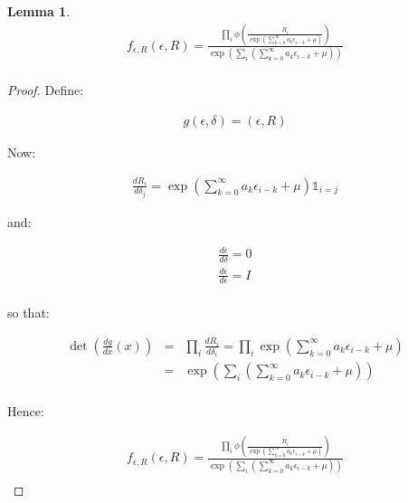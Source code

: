 \documentclass{article}
\newtheorem{lemma}{Lemma}
\begin{document}
\begin{lemma}
  \begin{eqnarray*}
    f_{\epsilon,R}\left(\epsilon,R\right) = \frac{\prod_i \phi\left( \frac{R_i}{\exp\left(\sum_{k=0}^\infty a_k \epsilon_{i-k} + \mu\right)}\right)}{\exp\left(\sum_i \left(\sum_{k=0}^\infty a_k \epsilon_{i-k} + \mu\right)\right)}\\
  \end{eqnarray*}
\end{lemma}
\begin{proof}
  Define:

  \begin{eqnarray*}
    g(\epsilon, \delta) = \left(\epsilon, R\right)
  \end{eqnarray*}

  Now:

  \begin{eqnarray*}
    \frac{d\!R_i}{d\!\delta_j} = \exp\left(\sum_{k=0}^\infty a_k\epsilon_{i-k} + \mu\right) \mathbb{1}_{i=j}
  \end{eqnarray*}

  and:

  \begin{eqnarray*}
    \frac{d\!\epsilon}{d\!\delta} = 0\\
    \frac{d\!\epsilon}{d\!\epsilon} = I\\
  \end{eqnarray*}

  so that:

  \begin{eqnarray*}
    \det\left(\frac{d\!g}{d\!x}(x)\right) & = & \prod_i \frac{d\!R_i}{d\!\delta_i} = \prod_i \exp\left(\sum_{k=0}^\infty a_k \epsilon_{i-k} + \mu\right)\\
    & = & \exp\left(\sum_i \left(\sum_{k=0}^\infty a_k \epsilon_{i-k} + \mu\right)\right)\\
  \end{eqnarray*}

  Hence:

  \begin{eqnarray*}
    f_{\epsilon,R}\left(\epsilon,R\right) = \frac{\prod_i \phi\left( \frac{R_i}{\exp\left(\sum_{k=0}^\infty a_k \epsilon_{i-k} + \mu\right)}\right)}{\exp\left(\sum_i \left(\sum_{k=0}^\infty a_k \epsilon_{i-k} + \mu\right)\right)}\\
  \end{eqnarray*}
\end{proof}
\end{document}
